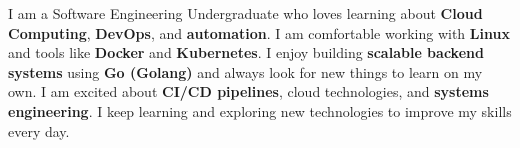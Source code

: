 
\begin{cvparagraph}

I am a Software Engineering Undergraduate who loves learning about \textbf{Cloud Computing}, \textbf{DevOps}, and \textbf{automation}. I am comfortable working with \textbf{Linux} and tools like \textbf{Docker} and \textbf{Kubernetes}. I enjoy building \textbf{scalable backend systems} using \textbf{Go (Golang)} and always look for new things to learn on my own. I am excited about \textbf{CI/CD pipelines}, cloud technologies, and \textbf{systems engineering}. I keep learning and exploring new technologies to improve my skills every day.

\end{cvparagraph}
